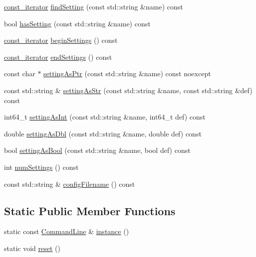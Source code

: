 \begin{DoxyCompactItemize}
\item 
\hyperlink{classtheoria_1_1util_1_1CommandLine_a729aa00feedd8257d4caafc73ac6ee63}{const\+\_\+iterator} \hyperlink{classtheoria_1_1util_1_1CommandLine_abb86432416368ace970920f3fc4fe9c6}{find\+Setting} (const std\+::string \&name) const
\item 
bool \hyperlink{classtheoria_1_1util_1_1CommandLine_a011dfbb3035341128a4e4e4f4a466cff}{has\+Setting} (const std\+::string \&name) const
\item 
\hyperlink{classtheoria_1_1util_1_1CommandLine_a729aa00feedd8257d4caafc73ac6ee63}{const\+\_\+iterator} \hyperlink{classtheoria_1_1util_1_1CommandLine_ae0758c3259074eddfc06c4a77ac3a1a9}{begin\+Settings} () const
\item 
\hyperlink{classtheoria_1_1util_1_1CommandLine_a729aa00feedd8257d4caafc73ac6ee63}{const\+\_\+iterator} \hyperlink{classtheoria_1_1util_1_1CommandLine_ae33c86c2a60d2470827b2206893c8f7b}{end\+Settings} () const
\item 
const char $\ast$ \hyperlink{classtheoria_1_1util_1_1CommandLine_ad5b4089e23a04d31c3edcf3d659ab8d9}{setting\+As\+Ptr} (const std\+::string \&name) const noexcept
\item 
const std\+::string \& \hyperlink{classtheoria_1_1util_1_1CommandLine_ac398ce852930a3974f9ed6a1c5255975}{setting\+As\+Str} (const std\+::string \&name, const std\+::string \&def) const
\item 
int64\+\_\+t \hyperlink{classtheoria_1_1util_1_1CommandLine_abec4516f24ea88f83f1cabb16157cf8f}{setting\+As\+Int} (const std\+::string \&name, int64\+\_\+t def) const
\item 
double \hyperlink{classtheoria_1_1util_1_1CommandLine_ae2ff2d5845f93ac135e9e4a1ff65b403}{setting\+As\+Dbl} (const std\+::string \&name, double def) const
\item 
bool \hyperlink{classtheoria_1_1util_1_1CommandLine_a745baeae69017e95c9c9cbe4633be2d6}{setting\+As\+Bool} (const std\+::string \&name, bool def) const
\item 
int \hyperlink{classtheoria_1_1util_1_1CommandLine_aa0f4075a16a8c490e5e27596534ca485}{num\+Settings} () const
\item 
const std\+::string \& \hyperlink{classtheoria_1_1util_1_1CommandLine_abac7c59a7bf3989959f0023455f3257e}{config\+Filename} () const
\end{DoxyCompactItemize}
\subsection*{Static Public Member Functions}
\begin{DoxyCompactItemize}
\item 
static const \hyperlink{classtheoria_1_1util_1_1CommandLine}{Command\+Line} \& \hyperlink{classtheoria_1_1util_1_1CommandLine_a361f672089b8bd3cb794645ee4629b72}{instance} ()
\item 
static void \hyperlink{classtheoria_1_1util_1_1CommandLine_a1a52772e7e3b17d0dd7aa099f28c4f1e}{reset} ()
\end{DoxyCompactItemize}


